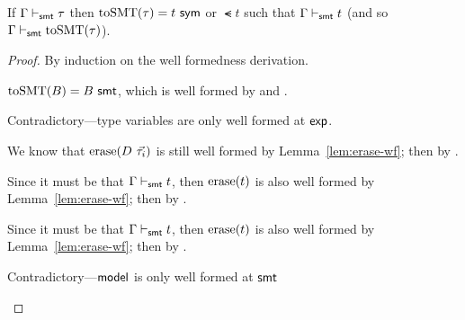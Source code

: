 \documentclass[acmsmall,screen,nonacm]{acmart}
\theoremstyle{definition}
\begin{document}
\begin{lemma}
\label{lem:tosmt-wf}
  If $\Gamma \vdash_{\mathsf{smt}} \tau$ then $\mathrm{toSMT}(\tau) = {t} ~ \mathsf{sym}$ or $\smt{t}$
  such that $\Gamma \vdash_{\mathsf{smt}} t$ (and so
  $\Gamma \vdash_{\mathsf{smt}} \mathrm{toSMT}(\tau)$).
%
\begin{proof}
  By induction on the well formedness derivation.
%
\begin{proofcases}

  \item[(\rn{$t$-Base})] $\mathrm{toSMT}(B) = {B} ~ \mathsf{smt}$, which is well formed
  by  and .

  \item[(\rn{$t$-TVar})] Contradictory---type variables are only well formed at $\mathsf{exp}$.

  \item[(\rn{$t$-ADT})] We know that $\mathrm{erase}(D ~ \vec{\tau_i})$ is
  still well formed by Lemma~\ref{lem:erase-wf}; then
  by .

  \item[(\rn{$\tau$-SMT})] Since it must be that $\Gamma \vdash_{\mathsf{smt}}
  t$, then $\mathrm{erase}(t)$ is also well formed by
  Lemma~\ref{lem:erase-wf}; then by .

  \item[(\rn{$\tau$-Sym})] Since it must be that $\Gamma \vdash_{\mathsf{smt}}
  t$, then $\mathrm{erase}(t)$ is also well formed by
  Lemma~\ref{lem:erase-wf}; then by .

  \item[(\rn{$\tau$-Model})] Contradictory---$\mathsf{model}$ is only well formed at $\mathsf{smt}$
%
  \qedhere

\end{proofcases}
\end{proof}
\end{lemma}
\end{document}
